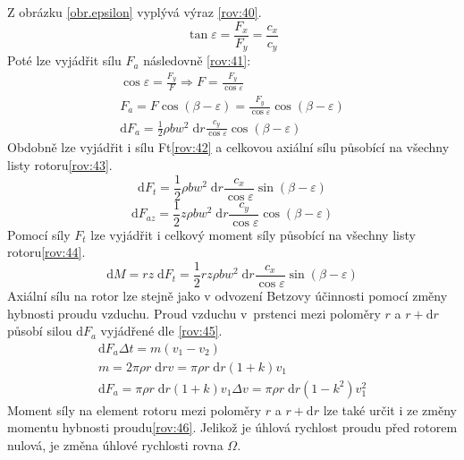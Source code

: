 	Z obrázku \ref{obr.epsilon} vyplývá výraz \eqref{rov:40}\cite{Rychetnik:Motory}.
	\begin{equation}
		\label{rov:40}
		\tan \varepsilon = \frac{F_x}{F_y} = \frac{c_x}{c_y}
	\end{equation}
	Poté lze vyjádřit sílu $F_a$ následovně \eqref{rov:41}\cite{Rychetnik:Motory}:
	\begin{eqnarray}
		\label{rov:41}
		\cos \varepsilon = \frac{F_y}{F}\Rightarrow F=\frac{F_y}{\cos \varepsilon} \nonumber \\
		F_a = F\cos(\beta-\varepsilon)=\frac{F_y}{\cos\varepsilon}\cos(\beta-\varepsilon) \nonumber \\
		\mathrm{d}F_a=\frac{1}{2}\rho bw^2\;\mathrm{d}r\frac{c_y}{\cos\varepsilon}\cos(\beta - \varepsilon)
	\end{eqnarray}
	Obdobně lze vyjádřit i sílu Ft\eqref{rov:42}\cite{Rychetnik:Motory} a celkovou axiální sílu působící na všechny listy rotoru\eqref{rov:43}\cite{Rychetnik:Motory}.
	\begin{equation}
		\label{rov:42}
		\mathrm{d}F_t=\frac{1}{2}\rho bw^2\;\mathrm{d}r\frac{c_x}{\cos\varepsilon}\sin(\beta - \varepsilon)
	\end{equation}
	\begin{equation}
		\label{rov:43}
		\mathrm{d}F_{az}=\frac{1}{2}z\rho bw^2\;\mathrm{d}r\frac{c_y}{\cos\varepsilon}\cos(\beta - \varepsilon)
	\end{equation}
	Pomocí síly $F_t$ lze vyjádřit i celkový moment síly působící na všechny listy rotoru\eqref{rov:44}\cite{Rychetnik:Motory}.
	\begin{equation}
			\label{rov:44}
			\mathrm{d}M=rz\;\mathrm{d}F_t=\frac{1}{2}rz\rho bw^2\;\mathrm{d}r\frac{c_x}{\cos\varepsilon}\sin(\beta - \varepsilon)
		\end{equation}
	Axiální sílu na rotor lze stejně jako v odvození Betzovy účinnosti pomocí změny hybnosti proudu vzduchu. Proud vzduchu v~prstenci mezi poloměry $r$ a $r + \mathrm{d}r$ působí silou $\mathrm{d}F_a$ vyjádřené dle \eqref{rov:45}\cite{Rychetnik:Motory}.
	\begin{eqnarray}
		\label{rov:45}
		\mathrm{d}F_a\Delta t=m(v_1-v_2) \nonumber \\
		m=2\pi\rho r\;\mathrm{d}rv=\pi\rho r\;\mathrm{d}r(1+k)v_1 \nonumber \\
		\mathrm{d}F_a=\pi\rho r\;\mathrm{d}r(1+k)v_1\Delta v = \pi\rho r\;\mathrm{d}r(1-k^2)v_1^2
	\end{eqnarray}
	Moment síly na element rotoru mezi poloměry $r$ a $r + \mathrm{d}r$ lze také určit i ze změny momentu hybnosti proudu\eqref{rov:46}\cite{Rychetnik:Motory}. Jelikož je úhlová rychlost proudu před rotorem nulová, je změna úhlové rychlosti rovna $\Omega$.
